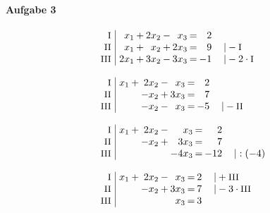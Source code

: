 \paragraph{Aufgabe 3}
\begin{equation*}
\begin{array}{l}
\setlength{\arraycolsep}{1pt}
\begin{array}{r|rcrcrcrl}
    \text{\small I } &\;  x_{1} & + & 2x_{2} & - &  x_{3} & = &  2 &                              \\
   \text{\small II } &\;  x_{1} & + &  x_{2} & + & 2x_{3} & = &  9 & \quad|-\text{\small I}       \\
  \text{\small III } &\; 2x_{1} & + & 3x_{2} & - & 3x_{3} & = & -1 & \quad|-2\cdot\text{\small I}   
\end{array}
\\ \\
\setlength{\arraycolsep}{1pt}
\begin{array}{r|rcrcrcrl}
    \text{\small I } &\; x_{1} & + & 2x_{2} & - &  x_{3} & = &  2 &                         \\
   \text{\small II } &\;       &   & -x_{2} & + & 3x_{3} & = &  7 &                         \\
  \text{\small III } &\;       &   & -x_{2} & - &  x_{3} & = & -5 & \quad|-\text{\small II}   
\end{array}
\\ \\
\setlength{\arraycolsep}{1pt}
\begin{array}{r|rcrcrcrl}
    \text{\small I } &\; x_{1} & + & 2x_{2} & - &   x_{3} & = &   2 &             \\
   \text{\small II } &\;       &   & -x_{2} & + &  3x_{3} & = &   7 &             \\
  \text{\small III } &\;       &   &        &   & -4x_{3} & = & -12 & \quad|:(-4)   
\end{array}
\\ \\
\setlength{\arraycolsep}{1pt}
\begin{array}{r|rcrcrcrl}
    \text{\small I } &\; x_{1} & + & 2x_{2} & - &  x_{3} & = & 2 & \quad|+\text{\small III}       \\
   \text{\small II } &\;       &   & -x_{2} & + & 3x_{3} & = & 7 & \quad|-3\cdot\text{\small III} \\
  \text{\small III } &\;       &   &        &   &  x_{3} & = & 3 &                                  
\end{array}

\end{array}
\end{equation*}
